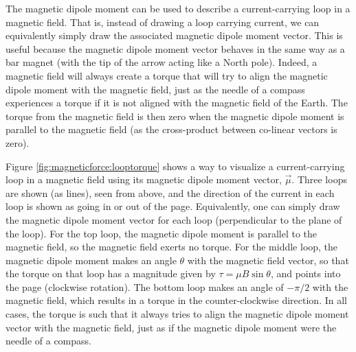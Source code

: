 The magnetic dipole moment can be used to describe a current-carrying loop in a magnetic field. That is, instead of drawing a loop carrying current, we can equivalently simply draw the associated magnetic dipole moment vector. This is useful because the magnetic dipole moment vector behaves in the same way as a bar magnet (with the tip of the arrow acting like a North pole). Indeed, a magnetic field will always create a torque that will try to align the magnetic dipole moment with the magnetic field, just as the needle of a compass experiences a torque if it is not aligned with the magnetic field of the Earth. The torque from the magnetic field is then zero when the magnetic dipole moment is parallel to the magnetic field (as the cross-product between co-linear vectors is zero). 

Figure \ref{fig:magneticforce:looptorque} shows a way to visualize a current-carrying loop in a magnetic field using its magnetic dipole moment vector, $\vec \mu$.  
Three loops are shown (as lines), seen from above, and the direction of the current in each loop is shown as going in or out of the page. Equivalently, one can simply draw the magnetic dipole moment vector for each loop (perpendicular to the plane of the loop). For the top loop, the magnetic dipole moment is parallel to the magnetic field, so the magnetic field exerts no torque. For the middle loop, the magnetic dipole moment makes an angle $\theta$ with the magnetic field vector, so that the torque on that loop has a magnitude given by $\tau=\mu B \sin\theta$, and points into the page (clockwise rotation). The bottom loop makes an angle of $-\pi/2$ with the magnetic field, which results in a torque in the counter-clockwise direction. In all cases, the torque is such that it always tries to align the magnetic dipole moment vector with the magnetic field, just as if the magnetic dipole moment were the needle of a compass. 
\newpage
